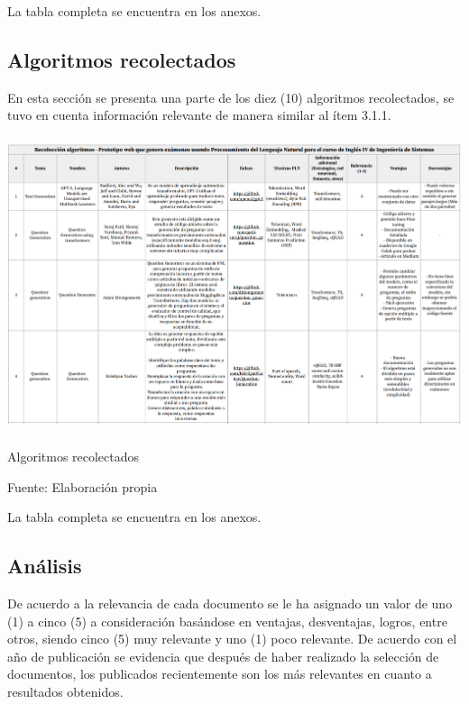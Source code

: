 \documentclass[../Main.tex]{subfiles}
\begin{document}
La tabla completa se encuentra en los anexos.

\subsection{Algoritmos recolectados}
\begin{justify}
En esta sección se presenta una parte de los diez (10) algoritmos recolectados, se tuvo en cuenta información relevante de manera similar al ítem 3.1.1.
\end{justify}

\begin{table}[H]
\begin{Center}
	\includegraphics[width=6.4in,height=3.4in]{Images/InicioTablaAlgoritmos.png}
    \caption{Algoritmos recolectados}
    Fuente: Elaboración propia
    \label{fig:section}
\label{tab:table1}
\end{Center}
\end{table}

La tabla completa se encuentra en los anexos.

%

\subsection{Análisis}

\begin{justify}
De acuerdo a la relevancia de cada documento se le ha asignado un valor de uno (1) a cinco (5) a consideración basándose en ventajas, desventajas, logros, entre otros, siendo cinco (5) muy relevante y uno (1) poco relevante. De acuerdo con el año de publicación se evidencia que después de haber realizado la selección de documentos, los publicados recientemente son los más relevantes en cuanto a resultados obtenidos.\par
\end{justify}
\end{document}
